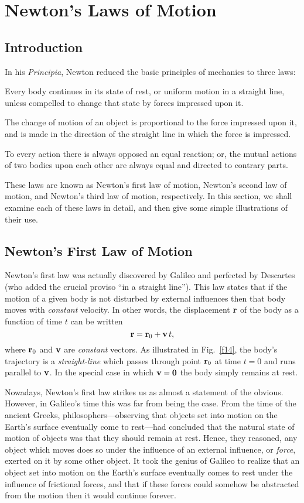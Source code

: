 \section{Newton's Laws of Motion}
\subsection{Introduction}
In his {\em Principia}, Newton reduced the basic principles of
mechanics to three laws:
\begin{enumerate}{\sf
\item Every body continues in its state of rest, or uniform motion in a straight line, unless
compelled to change that state by forces impressed upon it.
\item The change of motion of an object is proportional to the force impressed upon
it, and is made in the direction of the straight line in which the force is impressed.
\item To every action there is always opposed an equal reaction; or, the mutual actions
of two bodies upon each other are always equal and directed to contrary parts.  }
\end{enumerate}
These laws are known as Newton's first law of motion, Newton's second law of motion,
and Newton's third law of motion, respectively. In this section, we shall examine each of
these laws in detail, and then give some simple illustrations of their use.

\subsection{Newton's First Law of Motion}
Newton's first law was actually discovered by Galileo and perfected by
Descartes (who added the crucial proviso ``in a straight line''). This law
states that if the motion of a given body is not disturbed by external influences
then
that body moves with {\em constant} velocity. In other words, the displacement ${\bf r}$
of the body as a function of time $t$ can be written
\begin{equation}
{\bf r} = {\bf r}_0 + {\bf v}\,t,
\end{equation}
where ${\bf r}_0$ and ${\bf v}$ are {\em constant} vectors. As illustrated in
Fig.~\ref{f14}, the body's trajectory is a {\em straight-line} which
passes through point ${\bf r}_0$ at time $t=0$ and runs parallel to ${\bf v}$.
In the special case in which ${\bf v}={\bf 0}$  the body simply remains at rest.  

Nowadays, Newton's first law strikes us as almost a statement of the obvious. However,
in Galileo's time this was far from being the case. From the time of the ancient
Greeks, philosophers---observing that objects set into motion on the Earth's
surface eventually come to rest---had concluded that the natural state of motion
of objects was that they should remain at rest. Hence, they reasoned, any object which moves
does so under the influence of an external influence, or {\em force}, exerted on it by some other object.
It took the genius of Galileo to realize that an object set into motion
on the Earth's surface eventually comes to rest under the influence of frictional forces, and that if these
forces could somehow be abstracted from the motion then it would continue forever. 

